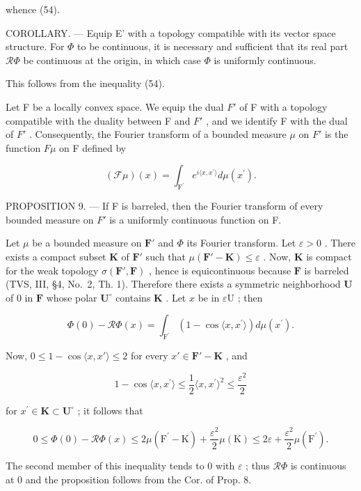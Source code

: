whence (54).

COROLLARY. --- Equip E' with a topology compatible with its vector space structure. For \(\Phi\) to be continuous, it is necessary and sufficient that its real part \(\mathcal{R}\Phi\) be continuous at the origin, in which case \(\Phi\) is uniformly continuous.

This follows from the inequality (54).

Let F be a locally convex space. We equip the dual \(F'\) of F with a topology compatible with the duality between F and \(F'\) , and we identify F with the dual of \(F'\) . Consequently, the Fourier transform of a bounded measure \(\mu\) on \(F'\) is the function \(F\mu\) on F defined by

\[
(\mathcal {F} \mu) (x) = \int_ {\mathrm{F} ^ {\prime}} e ^ {i \langle x, x ^ {\prime} \rangle} d \mu (x ^ {\prime}).
\]

PROPOSITION 9. --- If F is barreled, then the Fourier transform of every bounded measure on \(F'\) is a uniformly continuous function on F.

Let \(\mu\) be a bounded measure on \(\mathbf{F}'\) and \(\Phi\) its Fourier transform. Let \(\varepsilon > 0\) . There exists a compact subset \(\mathbf{K}\) of \(\mathbf{F}'\) such that \(\mu(\mathbf{F}' - \mathbf{K}) \leqslant \varepsilon\) . Now, \(\mathbf{K}\) is compact for the weak topology \(\sigma(\mathbf{F}', \mathbf{F})\) , hence is equicontinuous because \(\mathbf{F}\) is barreled (TVS, III, §4, No.~2, Th. 1). Therefore there exists a symmetric neighborhood \(\mathbf{U}\) of \(0\) in \(\mathbf{F}\) whose polar \(\mathbf{U}^{\circ}\) contains \(\mathbf{K}\) . Let \(x\) be in \(\varepsilon \mathrm{U}\) ; then

\[
\Phi (0) - \mathcal {R} \Phi (x) = \int_ {\mathrm{F} ^ {\prime}} \left(1 - \cos \langle x, x ^ {\prime} \rangle\right) d \mu (x ^ {\prime}).
\]

Now, \(0 \leqslant 1 - \cos \langle x, x' \rangle \leqslant 2\) for every \(x' \in \mathbf{F}' - \mathbf{K}\) , and

\[
1 - \cos \langle x, x ^ {\prime} \rangle \leqslant \frac {1}{2} \langle x, x ^ {\prime} \rangle^ {2} \leqslant \frac {\varepsilon^ {2}}{2}
\]

for \(x^{\prime}\in \mathbf{K}\subset \mathbf{U}^{\circ}\) ; it follows that

\[
0 \leqslant \Phi (0) - \mathcal {R} \Phi (x) \leqslant 2 \mu (\mathrm{F} ^ {\prime} - \mathrm{K}) + \frac {\varepsilon^ {2}}{2} \mu (\mathrm{K}) \leqslant 2 \varepsilon + \frac {\varepsilon^ {2}}{2} \mu (\mathrm{F} ^ {\prime}).
\]

The second member of this inequality tends to 0 with \(\varepsilon\) ; thus \(\mathcal{R}\Phi\) is continuous at 0 and the proposition follows from the Cor. of Prop. 8.

